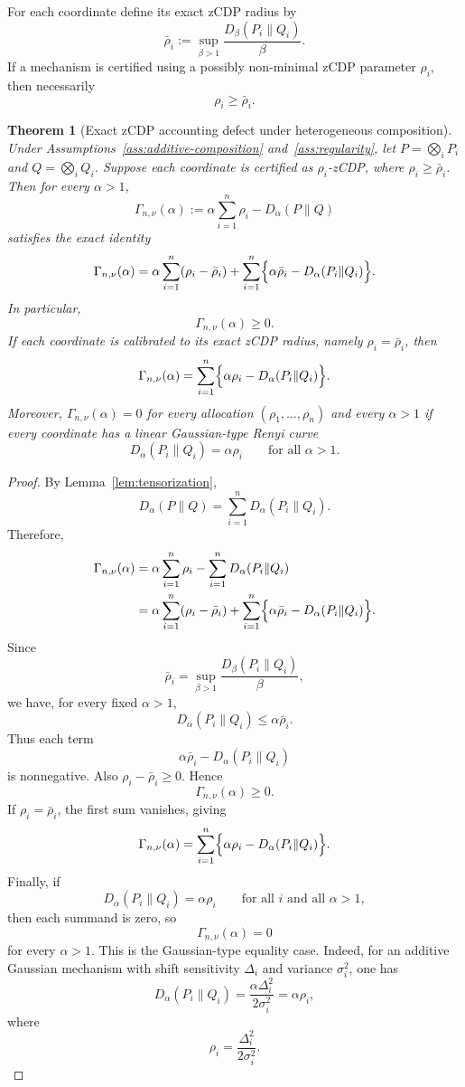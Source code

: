 \documentclass[11pt]{article}
\newtheorem{theorem}{Theorem}
\begin{document}
For each coordinate define its exact zCDP radius by
\[
\bar\rho_i
:=
\sup_{\beta>1}\frac{D_\beta(P_i\|Q_i)}{\beta}.
\]
If a mechanism is certified using a possibly non-minimal zCDP parameter
\(\rho_i\), then necessarily
\[
\rho_i\ge \bar\rho_i.
\]

\begin{theorem}[Exact zCDP accounting defect under heterogeneous composition]
\label{thm:zcdp-defect-composition}
Under Assumptions~\ref{ass:additive-composition} and~\ref{ass:regularity}, let
\(P=\bigotimes_i P_i\) and \(Q=\bigotimes_i Q_i\). Suppose each coordinate is
certified as \(\rho_i\)-zCDP, where \(\rho_i\ge \bar\rho_i\). Then for every
\(\alpha>1\),
\[
\Gamma_{n,\nu}(\alpha)
:=
\alpha\sum_{i=1}^n\rho_i-D_\alpha(P\|Q)
\]
satisfies the exact identity
\[
\Gamma_{n,\nu}(\alpha)
=
\alpha\sum_{i=1}^n(\rho_i-\bar\rho_i)
+
\sum_{i=1}^n
\Bigl\{\alpha\bar\rho_i-D_\alpha(P_i\|Q_i)\Bigr\}.
\]
In particular,
\[
\Gamma_{n,\nu}(\alpha)\ge 0.
\]
If each coordinate is calibrated to its exact zCDP radius, namely
\(\rho_i=\bar\rho_i\), then
\[
\Gamma_{n,\nu}(\alpha)
=
\sum_{i=1}^n
\Bigl\{\alpha\rho_i-D_\alpha(P_i\|Q_i)\Bigr\}.
\]
Moreover, \(\Gamma_{n,\nu}(\alpha)=0\) for every allocation
\((\rho_1,\dots,\rho_n)\) and every \(\alpha>1\) if every coordinate has a linear
Gaussian-type Renyi curve
\[
D_\alpha(P_i\|Q_i)=\alpha\rho_i
\qquad
\text{for all } \alpha>1.
\]
\end{theorem}

\begin{proof}
By Lemma~\ref{lem:tensorization},
\[
D_\alpha(P\|Q)
=
\sum_{i=1}^n D_\alpha(P_i\|Q_i).
\]
Therefore,
\[
\begin{aligned}
\Gamma_{n,\nu}(\alpha)
&=
\alpha\sum_{i=1}^n \rho_i
-
\sum_{i=1}^n D_\alpha(P_i\|Q_i) \\
&=
\alpha\sum_{i=1}^n(\rho_i-\bar\rho_i)
+
\sum_{i=1}^n
\Bigl\{\alpha\bar\rho_i-D_\alpha(P_i\|Q_i)\Bigr\}.
\end{aligned}
\]
Since
\[
\bar\rho_i
=
\sup_{\beta>1}\frac{D_\beta(P_i\|Q_i)}{\beta},
\]
we have, for every fixed \(\alpha>1\),
\[
D_\alpha(P_i\|Q_i)
\le
\alpha\bar\rho_i.
\]
Thus each term
\[
\alpha\bar\rho_i-D_\alpha(P_i\|Q_i)
\]
is nonnegative. Also \(\rho_i-\bar\rho_i\ge 0\). Hence
\[
\Gamma_{n,\nu}(\alpha)\ge 0.
\]
If \(\rho_i=\bar\rho_i\), the first sum vanishes, giving
\[
\Gamma_{n,\nu}(\alpha)
=
\sum_{i=1}^n
\Bigl\{\alpha\rho_i-D_\alpha(P_i\|Q_i)\Bigr\}.
\]
Finally, if
\[
D_\alpha(P_i\|Q_i)=\alpha\rho_i
\qquad
\text{for all } i \text{ and all } \alpha>1,
\]
then each summand is zero, so
\[
\Gamma_{n,\nu}(\alpha)=0
\]
for every \(\alpha>1\). This is the Gaussian-type equality case. Indeed, for an
additive Gaussian mechanism with shift sensitivity \(\Delta_i\) and variance
\(\sigma_i^2\), one has
\[
D_\alpha(P_i\|Q_i)
=
\frac{\alpha\Delta_i^2}{2\sigma_i^2}
=
\alpha\rho_i,
\]
where
\[
\rho_i=\frac{\Delta_i^2}{2\sigma_i^2}.
\]
\end{proof}
\end{document}
